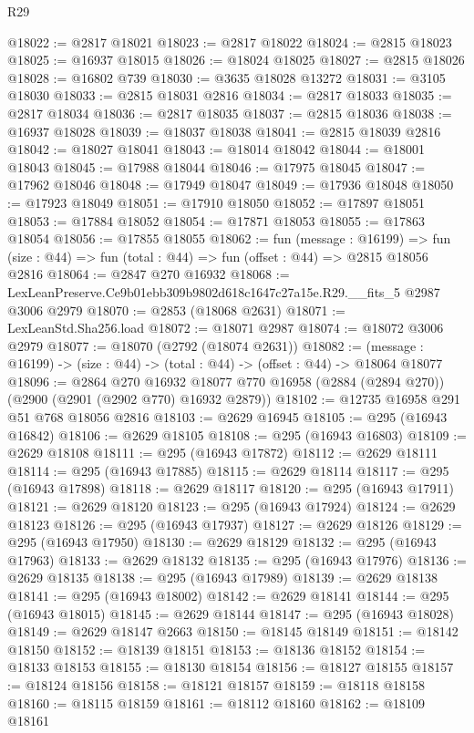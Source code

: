 \begin{lexlean}{R29}
\begin{coremodule}
@18022 := @2817 @18021
@18023 := @2817 @18022
@18024 := @2815 @18023
@18025 := @16937 @18015
@18026 := @18024 @18025
@18027 := @2815 @18026
@18028 := @16802 @739
@18030 := @3635 @18028 @13272
@18031 := @3105 @18030
@18033 := @2815 @18031 @2816
@18034 := @2817 @18033
@18035 := @2817 @18034
@18036 := @2817 @18035
@18037 := @2815 @18036
@18038 := @16937 @18028
@18039 := @18037 @18038
@18041 := @2815 @18039 @2816
@18042 := @18027 @18041
@18043 := @18014 @18042
@18044 := @18001 @18043
@18045 := @17988 @18044
@18046 := @17975 @18045
@18047 := @17962 @18046
@18048 := @17949 @18047
@18049 := @17936 @18048
@18050 := @17923 @18049
@18051 := @17910 @18050
@18052 := @17897 @18051
@18053 := @17884 @18052
@18054 := @17871 @18053
@18055 := @17863 @18054
@18056 := @17855 @18055
@18062 := fun (message : @16199) =>
  fun (size : @44) => fun (total : @44) => fun (offset : @44) => @2815 @18056 @2816
@18064 := @2847 @270 @16932
@18068 := LexLeanPreserve.Ce9b01ebb309b9802d618c1647c27a15e.R29.__fits_5 @2987 @3006 @2979
@18070 := @2853 (@18068 @2631)
@18071 := LexLeanStd.Sha256.load
@18072 := @18071 @2987
@18074 := @18072 @3006 @2979
@18077 := @18070 (@2792 (@18074 @2631))
@18082 := (message : @16199) -> (size : @44) -> (total : @44) -> (offset : @44) -> @18064 @18077
@18096 := @2864
    @270
    @16932
    @18077
    @770
    @16958
    (@2884 (@2894 @270))
    (@2900 (@2901 (@2902 @770) @16932 @2879))
@18102 := @12735 @16958 @291 @51 @768 @18056 @2816
@18103 := @2629 @16945
@18105 := @295 (@16943 @16842)
@18106 := @2629 @18105
@18108 := @295 (@16943 @16803)
@18109 := @2629 @18108
@18111 := @295 (@16943 @17872)
@18112 := @2629 @18111
@18114 := @295 (@16943 @17885)
@18115 := @2629 @18114
@18117 := @295 (@16943 @17898)
@18118 := @2629 @18117
@18120 := @295 (@16943 @17911)
@18121 := @2629 @18120
@18123 := @295 (@16943 @17924)
@18124 := @2629 @18123
@18126 := @295 (@16943 @17937)
@18127 := @2629 @18126
@18129 := @295 (@16943 @17950)
@18130 := @2629 @18129
@18132 := @295 (@16943 @17963)
@18133 := @2629 @18132
@18135 := @295 (@16943 @17976)
@18136 := @2629 @18135
@18138 := @295 (@16943 @17989)
@18139 := @2629 @18138
@18141 := @295 (@16943 @18002)
@18142 := @2629 @18141
@18144 := @295 (@16943 @18015)
@18145 := @2629 @18144
@18147 := @295 (@16943 @18028)
@18149 := @2629 @18147 @2663
@18150 := @18145 @18149
@18151 := @18142 @18150
@18152 := @18139 @18151
@18153 := @18136 @18152
@18154 := @18133 @18153
@18155 := @18130 @18154
@18156 := @18127 @18155
@18157 := @18124 @18156
@18158 := @18121 @18157
@18159 := @18118 @18158
@18160 := @18115 @18159
@18161 := @18112 @18160
@18162 := @18109 @18161

\end{coremodule}
\end{lexlean}
